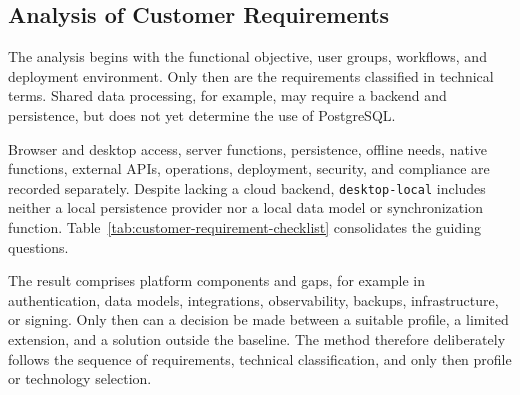 \subsection{Analysis of Customer Requirements}
\label{subsec:analyse-kundenanforderungen}

The analysis begins with the functional objective, user groups, workflows, and
deployment environment. Only then are the requirements classified in technical
terms. Shared data processing, for example, may require a backend and
persistence, but does not yet determine the use of PostgreSQL.

Browser and desktop access, server functions, persistence, offline needs,
native functions, external APIs, operations, deployment, security, and
compliance are recorded separately. Despite lacking a cloud backend,
\texttt{desktop-local} includes neither a local persistence provider nor a
local data model or synchronization function.
Table~\ref{tab:customer-requirement-checklist} consolidates the guiding
questions.



The result comprises platform components and gaps, for example in
authentication, data models, integrations, observability, backups,
infrastructure, or signing. Only then can a decision be made between a
suitable profile, a limited extension, and a solution outside the baseline.
The method therefore deliberately follows the sequence of requirements,
technical classification, and only then profile or technology selection.
